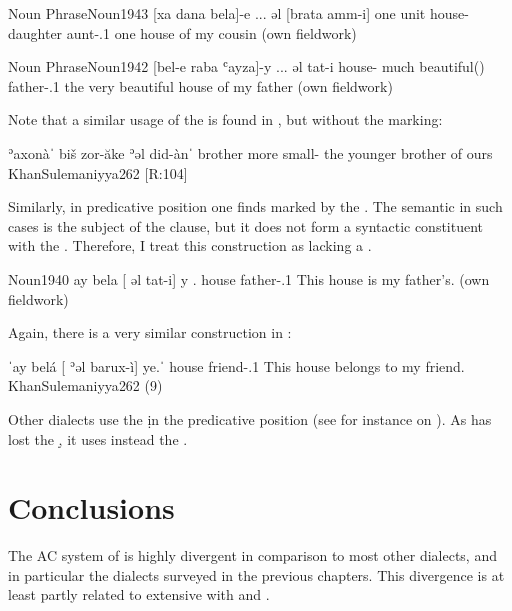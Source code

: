 \acex
{Noun Phrase}{Noun}{1943}
{[xa\cb{} dana bela]-e ... əl\cb{} [brata amm-i]	}
{one\cb{} unit house-\ez{} {} \dat\cb{} daughter aunt-\poss.1\sg}
{one house of my cousin}
{}{(own fieldwork)}


\acex
{Noun Phrase}{Noun}{1942}
{[bel-e raba ʿayza]-y ... əl\cb{} tat-i}
{house-\ez{} much beautiful(\masc) {} \dat\cb{} father-\poss.1\sg}
{the very beautiful house of my father }
{}{(own fieldwork)}

Note that a similar usage of the  is found in \JSul, but without the \ez* marking:

{ʾaxonàˈ biš\cb{} zor-ăke ʾəl did-ànˈ}
{brother more\cb{} small- \dat{} \pl}
{the younger brother of ours}
{KhanSulemaniyya}{262 {[R:104]}}\antipar
\newpage 
 

Similarly, in predicative position one finds \secns marked by the .  The semantic \prim in such cases is the subject of the clause, but it does not form a syntactic constituent with the \secn. Therefore, I treat this construction as lacking a \prim.

\acex
{\zero}{Noun}{1940}
{ay bela [\zero{} əl\cb{} tat-i] \cb{}y}
{\dem.\near{} house \hphantom{[}\zero{} \dat\cb{} father-\poss.1\sg{} \cb{}\cop}
{This house is my father's.}
{}{{(own fieldwork)}}

Again, there is a very similar construction in \JSul:

{ˈay\cb{} belá [\zero{} ʾəl\cb{} barux-ì] \cb{}ye.ˈ}
{\dem\cb{} house \hphantom{[}\zero{} \dat\cb{} friend-\poss.1\sg{} \cb{}\cop}
{This house belongs to my friend.}
{KhanSulemaniyya}{262 (9)}

Other dialects use the \lnk* \d in the predicative position (see for instance  on \Qar). As \JSan has lost the \lnk* \d, it uses instead the  . 



\section{Conclusions} \label{ss:JSan_conclusions}

The AC system of \JSan is highly divergent in comparison to most other  dialects, and in particular the dialects surveyed in the previous chapters. This divergence is at least partly related to extensive  with \Sor and \Per. 

